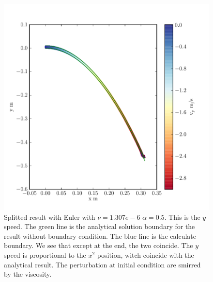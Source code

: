 \begin{figure}
	\includegraphics{topology/lateral_jet/plot_10__2_293.pdf}
			\caption{Splitted result with Euler with $\nu=1.307e-6$ $\alpha=0.5$.
	This is the $y$ speed.
	The green line is the analytical solution boundary for the result without boundary condition.
	The blue line is the calculate boundary.
	We see that except at the end, the two coincide.
	The $y$ speed is proportional to the $x^2$ position, witch coincide with the analytical result.
	The perturbation at initial condition are smirred by the viscosity.}
	\label{topo:extrap:lateral:10_2}
\end{figure}


